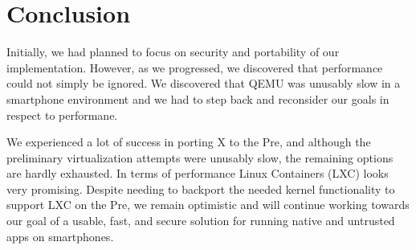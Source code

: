 \section{Conclusion}
\label{sec:conclusion}
Initially, we had planned to focus on security and portability of our implementation.  However, as we progressed, we discovered that performance could not simply be ignored.  We discovered that QEMU was unusably slow in a smartphone environment and we had to step back and reconsider our goals in respect to performane.

We experienced a lot of success in porting X to the Pre, and although the preliminary virtualization attempts were unusably slow, the remaining options are hardly exhausted.  In terms of performance Linux Containers (LXC) looks very promising.  Despite needing to backport the needed kernel functionality to support LXC on the Pre, we remain optimistic and will continue working towards our goal of a usable, fast, and secure solution for running native and untrusted apps on smartphones.

